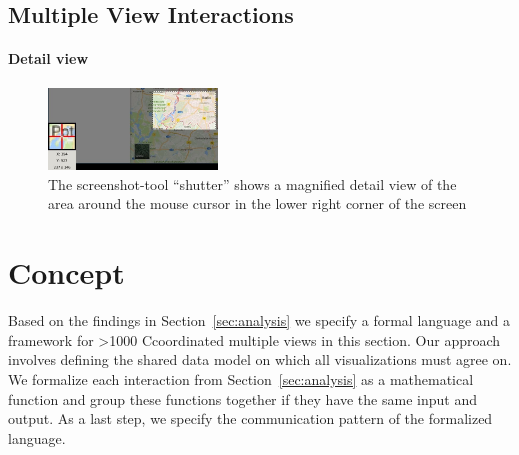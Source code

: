 \documentclass{article}
\newcommand\hmm[1]{\ifnum\ifhmode\spacefactor\else2000\fi>1000 \uppercase{#1}\else#1\fi}
\newcommand{\cmvs}{\hmm{c}oordinated multiple views}
\begin{document}
\subsection{Multiple View Interactions}\label{sec:analysis:examples}

\paragraph{Detail view}
\begin{figure}
  \centering
  \includegraphics[width=0.4\textwidth]{images/chartTypes/multi/detail-view}
  \caption{The screenshot-tool ``shutter'' shows a magnified detail view of the area around the mouse cursor in the lower right corner of the screen}\label{fig:concept:chart-types:detail}
\end{figure}

\clearpage
\section{Concept}\label{sec:concept}
Based on the findings in Section~\ref{sec:analysis} we specify a formal language and a framework for \cmvs{} in this section.
Our approach involves defining the shared data model on which all visualizations must agree on.
We formalize each interaction from Section~\ref{sec:analysis} as a mathematical function and group these functions together if they have the same input and output.
As a last step, we specify the communication pattern of the formalized language.


%
%
%
\end{document}
